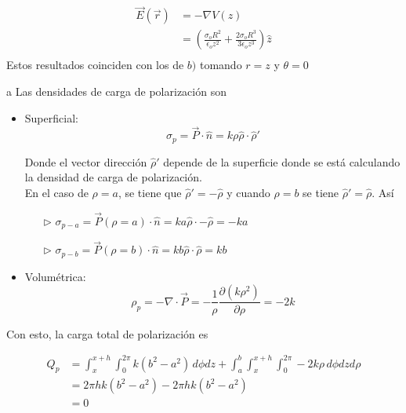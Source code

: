\begin{equation}
\begin{split}
    \Vec{E}(\Vec{r}) &= -\nabla V(z)\\
    &= \left(\frac{\sigma_oR^2}{\epsilon_o z^2}+
    \frac{2\sigma_oR^3}{3\epsilon_oz^3}\right)\hat{z}\\
\end{split}
\nonumber
\end{equation}
\medbreak
Estos resultados coinciden con los de $b)$ tomando $r=z$ y $\theta=0$
\bigbreak

\begin{solucion}{4}
    \ics a Las densidades de carga de polarización son

\begin{itemize}
    \item Superficial:
    \[\sigma_p=\Vec{P}\cdot\hat{n}=k\rho\hat{\rho}\cdot\hat{\rho}'\]
    
    Donde el vector dirección $\hat{\rho}'$ depende de la superficie donde se está calculando la densidad de carga de polarización.\\
    
    En el caso de $\rho = a$, se tiene que $\hat{\rho}' = -\hat{\rho}$ y cuando $\rho = b$ se tiene $\hat{\rho}' = \hat{\rho}$. Así
    
    \begin{itemize}
        \item[$\triangleright$] $\sigma_{p-a}
                =\Vec{P}(\rho = a)\cdot\hat{n}
                =ka\hat{\rho}\cdot-\hat{\rho}
                =-ka$
        
        \item[$\triangleright$] $\sigma_{p-b}
                =\Vec{P}(\rho = b)\cdot\hat{n}
                =kb\hat{\rho}\cdot\hat{\rho}
                =kb$
        
    \end{itemize}
    
    \item Volumétrica:
    \[\rho_p=-\nabla\cdot\Vec{P}=-\frac{1}{\rho}\frac{\partial(k\rho^2)}{\partial\rho}= -2k\]
\end{itemize}

Con esto, la carga total de polarización es

\begin{equation}
\begin{split}
    Q_p &= \int^{x+h}_x\int^{2\pi}_0k(b^2-a^2)\,d\phi dz+
    \int^b_a\int^{x+h}_x\int^{2\pi}_0-2k\rho\,d\phi dz d\rho\\
    &= 2\pi hk(b^2-a^2) - 2\pi hk(b^2-a^2)\\
    &= 0\\
\end{split}
\nonumber
\end{equation}


\end{solucion}
